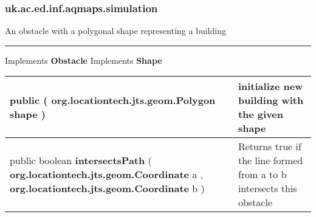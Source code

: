 \subsubsection*{ uk.ac.ed.inf.aqmaps.simulation }
 {\scriptsize An obstacle with a polygonal shape representing a building
 
\vspace*{4pt} \hrule \vspace*{3pt}
Implements \textbf{ Obstacle }
Implements \textbf{ Shape }
\vspace*{-5pt} 
\begin{tabularx}{\linewidth}{m{}|m{}}
\label{tab:Building}
\begin{raggedleft}public  \textbf{\hyperref[tab:Building]{\color{blue}{Building}} }(\hspace*{ 5pt} \textbf{org.locationtech.jts.geom.Polygon} shape  )
\end{raggedleft} &
 initialize new building with the given shape\\ \hline 
\begin{raggedleft}public boolean \textbf{intersectsPath }(\newline \hfill 
\hspace*{ 5pt} \textbf{org.locationtech.jts.geom.Coordinate} a , \newline
 \hspace*{ 5pt} \textbf{org.locationtech.jts.geom.Coordinate} b  )
\end{raggedleft} &
 Returns true if the line formed from a to b intersects this obstacle\\\end{tabularx}
}

